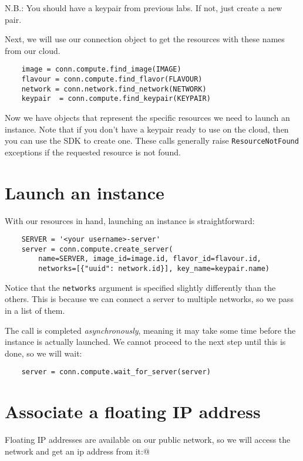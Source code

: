 \documentclass{article}
\begin{document}
N.B.: You should have a keypair from previous labs. If not, just create a new pair.


\newpage

Next, we will use our connection object to get the resources with these names from our cloud.

\begin{verbatim}
    image = conn.compute.find_image(IMAGE)
    flavour = conn.compute.find_flavor(FLAVOUR)
    network = conn.network.find_network(NETWORK)
    keypair  = conn.compute.find_keypair(KEYPAIR)
\end{verbatim}

Now we have objects that represent the specific resources we need to launch an instance. Note that if you don't have a keypair ready to use on the cloud, then you can use the SDK to create one. These calls generally raise \texttt{ResourceNotFound} exceptions if the requested resource is not found.

\section{Launch an instance}
With our resources in hand, launching an instance is straightforward:

\begin{verbatim}
    SERVER = '<your username>-server'
    server = conn.compute.create_server(
        name=SERVER, image_id=image.id, flavor_id=flavour.id,
        networks=[{"uuid": network.id}], key_name=keypair.name) 
\end{verbatim}

Notice that the \texttt{networks} argument is specified slightly differently than the others. This is because we can connect a server to multiple networks, so we pass in a list of them.

The call is completed \emph{asynchronously}, meaning it may take some time before the instance is actually launched. We cannot proceed to the next step until this is done, so we will wait:

\begin{verbatim}
    server = conn.compute.wait_for_server(server)
\end{verbatim}


\section{Associate a floating IP address}
Floating IP addresses are available on our public network, so we will access the network and get an ip address from it:@
\end{document}
